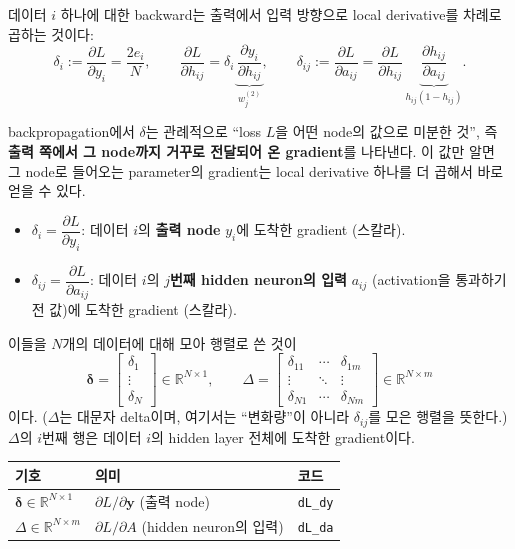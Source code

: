 \documentclass[11pt,a4paper]{article}
\newcommand{\R}{\mathbb{R}}
\newcommand{\vect}[1]{\bm{#1}}
\begin{document}
데이터 $i$ 하나에 대한 backward는 출력에서 입력 방향으로
local derivative를 차례로 곱하는 것이다:
\[
\delta_i
:=
\frac{\partial L}{\partial y_i}
=
\frac{2e_i}{N},
\qquad
\frac{\partial L}{\partial h_{ij}}
=
\delta_i\,
\underbrace{\frac{\partial y_i}{\partial h_{ij}}}_{w^{(2)}_j},
\qquad
\delta_{ij}
:=
\frac{\partial L}{\partial a_{ij}}
=
\frac{\partial L}{\partial h_{ij}}\,
\underbrace{\frac{\partial h_{ij}}{\partial a_{ij}}}_{h_{ij}(1-h_{ij})}.
\]

\begin{thinkbox}
backpropagation에서 $\delta$는 관례적으로
``loss $L$을 어떤 node의 값으로 미분한 것'', 즉
\textbf{출력 쪽에서 그 node까지 거꾸로 전달되어 온 gradient}를 나타낸다.
이 값만 알면 그 node로 들어오는 parameter의 gradient는
local derivative 하나를 더 곱해서 바로 얻을 수 있다.

\begin{itemize}[leftmargin=1.8em]
\item $\delta_i=\dfrac{\partial L}{\partial y_i}$:
데이터 $i$의 \textbf{출력 node} $y_i$에 도착한 gradient (스칼라).
\item $\delta_{ij}=\dfrac{\partial L}{\partial a_{ij}}$:
데이터 $i$의 \textbf{$j$번째 hidden neuron의 입력} $a_{ij}$
(activation을 통과하기 전 값)에 도착한 gradient (스칼라).
\end{itemize}

이들을 $N$개의 데이터에 대해 모아 행렬로 쓴 것이
\[
\boldsymbol\delta
=
\begin{bmatrix}
\delta_1\\ \vdots\\ \delta_N
\end{bmatrix}
\in\R^{N\times1},
\qquad
\Delta
=
\begin{bmatrix}
\delta_{11} & \cdots & \delta_{1m}\\
\vdots & \ddots & \vdots\\
\delta_{N1} & \cdots & \delta_{Nm}
\end{bmatrix}
\in\R^{N\times m}
\]
이다. ($\Delta$는 대문자 delta이며, 여기서는 ``변화량''이 아니라 $\delta_{ij}$를 모은 행렬을 뜻한다.)
$\Delta$의 $i$번째 행은 데이터 $i$의 hidden layer 전체에 도착한 gradient이다.

\begin{center}
\begin{tabular}{@{}lll@{}}
\toprule
기호 & 의미 & 코드 \\
\midrule
$\boldsymbol\delta\in\R^{N\times1}$ & $\partial L/\partial \vect{y}$ (출력 node) & \texttt{dL\_dy} \\
$\Delta\in\R^{N\times m}$ & $\partial L/\partial A$ (hidden neuron의 입력) & \texttt{dL\_da} \\
\bottomrule
\end{tabular}
\end{center}
\end{thinkbox}
\end{document}
